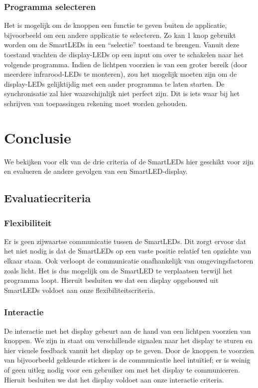 \documentclass{article}
\begin{document}
\subsubsection{Programma selecteren}

Het is mogelijk om de knoppen een functie te geven buiten de applicatie, bijvoorbeeld om een andere applicatie te selecteren. Zo kan 1 knop gebruikt worden om de SmartLEDs in een “selectie” toestand te brengen. Vanuit deze toestand wachten de display-LEDs op een input om over te schakelen naar het volgende programma. Indien de lichtpen voorzien is van een groter bereik (door meerdere infrarood-LEDs te monteren), zou het mogelijk moeten zijn om de display-LEDs gelijktijdig met een ander programma te laten starten. De synchronisatie zal hier waarschijnlijk niet perfect zijn. Dit is iets waar bij het schrijven van toepassingen rekening moet worden gehouden.

\section{Conclusie}

We bekijken voor elk van de drie criteria of de SmartLEDs hier geschikt voor zijn en evalueren de andere gevolgen van een SmartLED-display.
 
\subsection{Evaluatiecriteria}
\subsubsection{Flexibiliteit}

Er is geen zijwaartse communicatie tussen de SmartLEDs. Dit zorgt ervoor dat het niet nodig is dat de SmartLEDs op een vaste positie relatief ten opzichte van elkaar staan. Ook verloopt de communicatie onafhankelijk van omgevingsfactoren zoals licht. Het is dus mogelijk om de SmartLED te verplaatsen terwijl het programma loopt. Hieruit besluiten we dat een display opgebouwd uit SmartLEDs voldoet aan onze flexibiliteitscriteria.

\subsubsection{Interactie}

De interactie met het display gebeurt aan de hand van een lichtpen voorzien van knoppen. We zijn in staat om verschillende signalen naar het display te sturen en hier visuele feedback vanuit het display op te geven. Door de knoppen te voorzien van bijvoorbeeld gekleurde stickers is de communicatie heel intuïtief; er is weinig of geen uitleg nodig voor een gebruiker om met het display te communiceren. Hieruit besluiten we dat het display voldoet aan onze interactie criteria.
\end{document}
